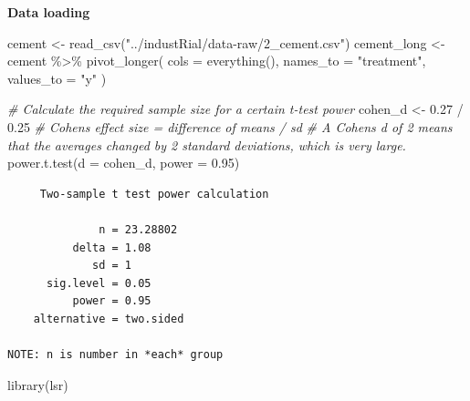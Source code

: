 \documentclass[
]{book}
\newenvironment{Shaded}{\begin{snugshade}}{\end{snugshade}}
\newcommand{\AttributeTok}[1]{\textcolor[rgb]{0.77,0.63,0.00}{#1}}
\newcommand{\CommentTok}[1]{\textcolor[rgb]{0.56,0.35,0.01}{\textit{#1}}}
\newcommand{\FloatTok}[1]{\textcolor[rgb]{0.00,0.00,0.81}{#1}}
\newcommand{\FunctionTok}[1]{\textcolor[rgb]{0.00,0.00,0.00}{#1}}
\newcommand{\NormalTok}[1]{#1}
\newcommand{\OtherTok}[1]{\textcolor[rgb]{0.56,0.35,0.01}{#1}}
\newcommand{\SpecialCharTok}[1]{\textcolor[rgb]{0.00,0.00,0.00}{#1}}
\newcommand{\StringTok}[1]{\textcolor[rgb]{0.31,0.60,0.02}{#1}}
\begin{document}
\textbf{Data loading}

\begin{Shaded}
\begin{Highlighting}[]
\NormalTok{cement }\OtherTok{\textless{}{-}} \FunctionTok{read\_csv}\NormalTok{(}\StringTok{"../industRial/data{-}raw/2\_cement.csv"}\NormalTok{)}
\NormalTok{cement\_long }\OtherTok{\textless{}{-}}\NormalTok{ cement }\SpecialCharTok{\%\textgreater{}\%}
  \FunctionTok{pivot\_longer}\NormalTok{(}
    \AttributeTok{cols =} \FunctionTok{everything}\NormalTok{(), }\AttributeTok{names\_to =} \StringTok{"treatment"}\NormalTok{, }\AttributeTok{values\_to =} \StringTok{"y"}
\NormalTok{  )}
\end{Highlighting}
\end{Shaded}

\begin{Shaded}
\begin{Highlighting}[]
\CommentTok{\# Calculate the required sample size for a certain t{-}test power}
\NormalTok{cohen\_d }\OtherTok{\textless{}{-}} \FloatTok{0.27} \SpecialCharTok{/} \FloatTok{0.25} \CommentTok{\# Cohen\textquotesingle{}s effect size = difference of means / sd}
\CommentTok{\# A Cohen\textquotesingle{}s d of 2 means that the averages changed by 2 standard deviations, which is very large.}
\FunctionTok{power.t.test}\NormalTok{(}\AttributeTok{d =}\NormalTok{ cohen\_d, }\AttributeTok{power =} \FloatTok{0.95}\NormalTok{)}
\end{Highlighting}
\end{Shaded}

\begin{verbatim}
     Two-sample t test power calculation 

              n = 23.28802
          delta = 1.08
             sd = 1
      sig.level = 0.05
          power = 0.95
    alternative = two.sided

NOTE: n is number in *each* group
\end{verbatim}

\begin{Shaded}
\begin{Highlighting}[]
\FunctionTok{library}\NormalTok{(lsr)}
\end{Highlighting}
\end{Shaded}

\begin{Shaded}
\end{Shaded}
\end{document}

